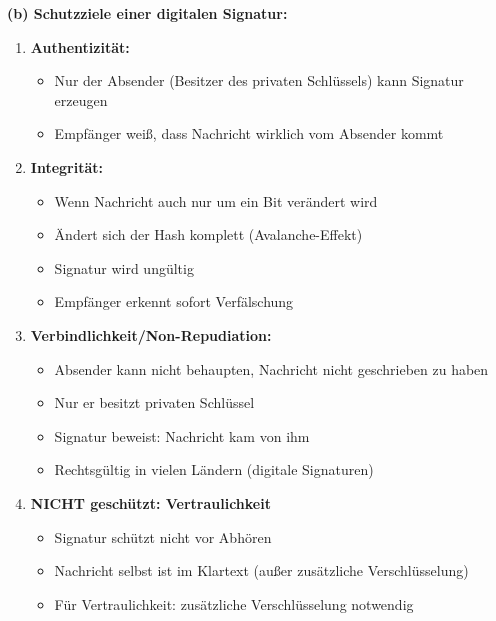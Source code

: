 \documentclass[12pt,a4paper]{article}
\begin{document}
\begin{tcolorbox}[colback=solutionbg, colframe=black!30]

\textbf{(b) Schutzziele einer digitalen Signatur:} \checkmark

\begin{enumerate}[1.]
    \item \textbf{Authentizität:}
    \begin{itemize}
        \item Nur der Absender (Besitzer des privaten Schlüssels) kann Signatur erzeugen
        \item Empfänger weiß, dass Nachricht wirklich vom Absender kommt
    \end{itemize}
    
    \item \textbf{Integrität:}
    \begin{itemize}
        \item Wenn Nachricht auch nur um ein Bit verändert wird
        \item Ändert sich der Hash komplett (Avalanche-Effekt)
        \item Signatur wird ungültig
        \item Empfänger erkennt sofort Verfälschung
    \end{itemize}
    
    \item \textbf{Verbindlichkeit/Non-Repudiation:}
    \begin{itemize}
        \item Absender kann nicht behaupten, Nachricht nicht geschrieben zu haben
        \item Nur er besitzt privaten Schlüssel
        \item Signatur beweist: Nachricht kam von ihm
        \item Rechtsgültig in vielen Ländern (digitale Signaturen)
    \end{itemize}
    
    \item \textbf{NICHT geschützt: Vertraulichkeit}
    \begin{itemize}
        \item Signatur schützt nicht vor Abhören
        \item Nachricht selbst ist im Klartext (außer zusätzliche Verschlüsselung)
        \item Für Vertraulichkeit: zusätzliche Verschlüsselung notwendig
    \end{itemize}
\end{enumerate}

\end{tcolorbox}
\end{document}

